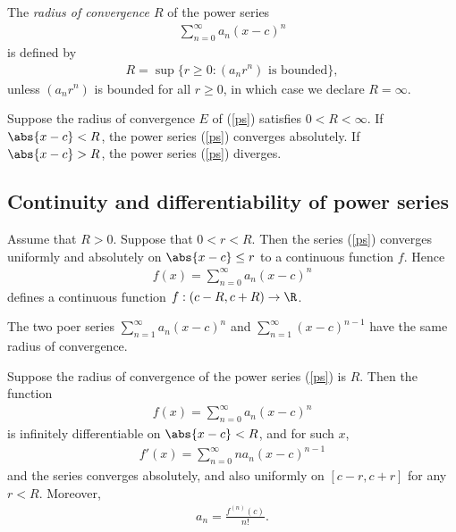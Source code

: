 \documentclass{article}
\begin{document}
\begin{definition}[Notes 3.1]
    The \emph{radius of convergence $R$} of the power series 
    \begin{align}
        \label{ps}
        \sum_{n=0}^\infty a_n(x-c)^n     
    \end{align}
    is defined by 
    \begin{align*}
        R = \sup\{r\geq 0:(a_nr^n) \text{ is bounded}\},
    \end{align*}
    unless $(a_nr^n)$ is bounded for all $r\geq 0$, in which case we declare $R=\infty$.
\end{definition}

\begin{theorem}[Notes 3.1]
    Suppose the radius of convergence $E$ of (\ref{ps}) satisfies $0<R<\infty$. 
    If $\abs{x-c}<R$, the power series (\ref{ps}) converges absolutely. If 
    $\abs{x-c}>R$, the power series (\ref{ps}) diverges.
\end{theorem}

\subsection{Continuity and differentiability of power series}

\begin{theorem}[Notes 3.2]
    Assume that $R>0$. Suppose that $0<r<R$. Then the series (\ref{ps}) converges
    uniformly and absolutely on $\abs{x-c}\leq r$ to a continuous function $f$.
    Hence 
    \begin{align*}
        f(x) = \sum_{n=0}^\infty a_n(x-c)^n     
    \end{align*}
    defines a continuous function $f:(c-R, c+R)\to\R$.
\end{theorem}

\begin{lemma}[Notes 3.1]
    The two poer series $\sum_{n=1}^\infty a_n(x-c)^n$ and $\sum_{n=1}^\infty (x-c)^{n-1}$
    have the same radius of convergence.
\end{lemma}

\begin{theorem}[Notes 3.3]
    Suppose the radius of convergence of the power series (\ref{ps}) is $R$. Then 
    the function 
    \begin{align*}
        f(x) = \sum_{n=0}^\infty a_n(x-c)^n
    \end{align*}
    is infinitely differentiable on $\abs{x-c} < R$, and for such $x$,
    \begin{align*}
        f'(x) = \sum_{n=0}^\infty na_n(x-c)^{n-1}
    \end{align*}
    and the series converges absolutely, and also uniformly on $[c-r, c+r]$ for any 
    $r<R$. Moreover, 
    \begin{align*}
        a_n = \frac{f^{(n)}(c)}{n!}.
    \end{align*}
\end{theorem}
\end{document}
